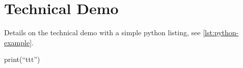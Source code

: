 \section{Technical Demo}
Details on the technical demo with a simple python listing, see \cref{lst:python-example}.
\begin{python}[caption={Python Hello-World example},label={lst:python-example},aboveskip={\bigskipamount}]
  print(``ttt'')
\end{python}